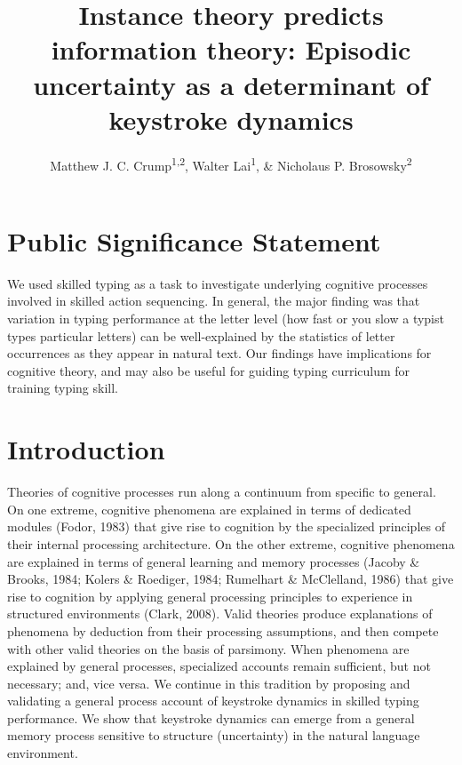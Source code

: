 \documentclass[,man,floatsintext]{apa6}
\title{Instance theory predicts information theory: Episodic uncertainty as a determinant of keystroke dynamics}
\author{Matthew J. C. Crump\textsuperscript{1,2}, Walter Lai\textsuperscript{1}, \& Nicholaus P. Brosowsky\textsuperscript{2}}
\date{}
\affiliation{
\vspace{0.5cm}
\textsuperscript{1} Brooklyn College of the City University of New York\\\textsuperscript{2} The Graduate Center of the City University of New York}
\begin{document}
\maketitle

\hypertarget{public-significance-statement}{%
\section{Public Significance Statement}\label{public-significance-statement}}

We used skilled typing as a task to investigate underlying cognitive processes involved in skilled action sequencing. In general, the major finding was that variation in typing performance at the letter level (how fast or you slow a typist types particular letters) can be well-explained by the statistics of letter occurrences as they appear in natural text. Our findings have implications for cognitive theory, and may also be useful for guiding typing curriculum for training typing skill.

\newpage

\hypertarget{introduction}{%
\section{Introduction}\label{introduction}}

Theories of cognitive processes run along a continuum from specific to general. On one extreme, cognitive phenomena are explained in terms of dedicated modules (Fodor, 1983) that give rise to cognition by the specialized principles of their internal processing architecture. On the other extreme, cognitive phenomena are explained in terms of general learning and memory processes (Jacoby \& Brooks, 1984; Kolers \& Roediger, 1984; Rumelhart \& McClelland, 1986) that give rise to cognition by applying general processing principles to experience in structured environments (Clark, 2008). Valid theories produce explanations of phenomena by deduction from their processing assumptions, and then compete with other valid theories on the basis of parsimony. When phenomena are explained by general processes, specialized accounts remain sufficient, but not necessary; and, vice versa. We continue in this tradition by proposing and validating a general process account of keystroke dynamics in skilled typing performance. We show that keystroke dynamics can emerge from a general memory process sensitive to structure (uncertainty) in the natural language environment.
\end{document}
